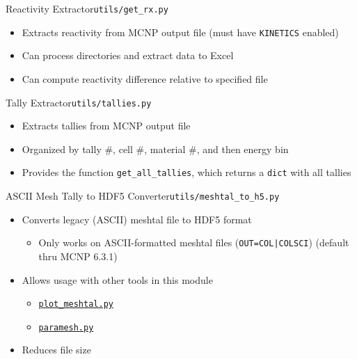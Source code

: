 \documentclass[aspectratio=169]{beamer}
\begin{document}
\begin{frame}{Reactivity Extractor}{\lstinline{utils/get_rx.py}}\label{get-rx}
  \begin{itemize}
    \item{Extracts reactivity from MCNP output file (must have \lstinline{KINETICS} enabled)}
    \item{Can process directories and extract data to Excel}
    \item{Can compute reactivity difference relative to specified file}
  \end{itemize}
  \begin{example}
    
  \end{example}
\end{frame}

\begin{frame}{Tally Extractor}{\lstinline{utils/tallies.py}}\label{tallies}
  \begin{itemize}
    \item{Extracts tallies from MCNP output file}
    \item{Organized by tally \#, cell \#, material \#, and then energy bin}
    \item{Provides the function \lstinline{get_all_tallies}, which returns a \lstinline{dict} with all tallies}
  \end{itemize}
  \begin{example}
    
  \end{example}
\end{frame}

\begin{frame}{ASCII Mesh Tally to HDF5 Converter}{\lstinline{utils/meshtal_to_h5.py}}\label{meshtal-to-h5}
  \begin{itemize}
    \item{
      Converts legacy (ASCII) meshtal file to HDF5 format
      \begin{itemize}
        \item{Only works on ASCII-formatted meshtal files (\lstinline{OUT=COL|COLSCI}) (default thru MCNP 6.3.1)}
      \end{itemize}
    }
    \item{
      Allows usage with other tools in this module
      \begin{itemize}
        \item{\hyperlink{plot-meshtally}{\lstinline{plot_meshtal.py}}}
        \item{\hyperlink{paramesh}{\lstinline{paramesh.py}}}
      \end{itemize}
    }
    \item{Reduces file size}
  \end{itemize}
  \begin{example}
    
  \end{example}
\end{frame}
\end{document}
